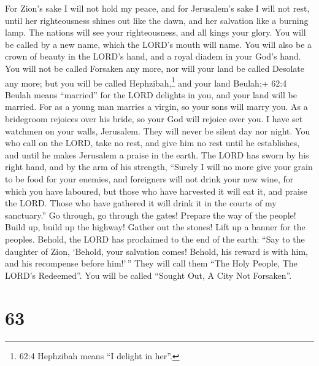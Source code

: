  For Zion's sake I will not hold my peace, and for
Jerusalem's sake I will not rest, until her righteousness shines out
like the dawn, and her salvation like a burning lamp.  The
nations will see your righteousness, and all kings your glory. You will
be called by a new name, which the LORD's mouth will name. 
You will also be a crown of beauty in the LORD's hand, and a royal
diadem in your God's hand.  You will not be called Forsaken
any more, nor will your land be called Desolate any more; but you will
be called Hephzibah,\footnote{62:4 Hephzibah means ``I delight in her''.}
and your land Beulah;+ 62:4 Beulah means ``married'' for the LORD
delights in you, and your land will be married.  For as a
young man marries a virgin, so your sons will marry you. As a bridegroom
rejoices over his bride, so your God will rejoice over you. 
I have set watchmen on your walls, Jerusalem. They will never be silent
day nor night. You who call on the LORD, take no rest,  and
give him no rest until he establishes, and until he makes Jerusalem a
praise in the earth.  The LORD has sworn by his right hand,
and by the arm of his strength, ``Surely I will no more give your grain
to be food for your enemies, and foreigners will not drink your new
wine, for which you have laboured,  but those who have
harvested it will eat it, and praise the LORD. Those who have gathered
it will drink it in the courts of my sanctuary.''  Go
through, go through the gates! Prepare the way of the people! Build up,
build up the highway! Gather out the stones! Lift up a banner for the
peoples.  Behold, the LORD has proclaimed to the end of the
earth: ``Say to the daughter of Zion, `Behold, your salvation comes!
Behold, his reward is with him, and his recompense before him!'\,''
 They will call them ``The Holy People, The LORD's
Redeemed''. You will be called ``Sought Out, A City Not Forsaken''.

\hypertarget{section-60}{%
\section{63}\label{section-60}}

